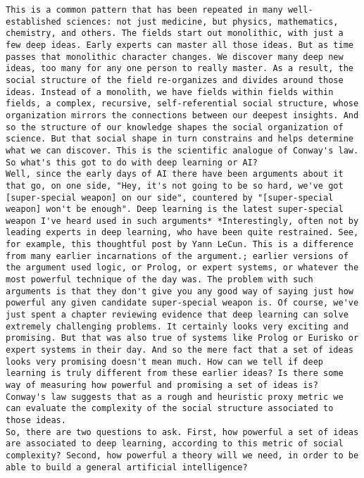\begin{lstlisting}
This is a common pattern that has been repeated in many well-established sciences: not just medicine, but physics, mathematics, chemistry, and others. The fields start out monolithic, with just a few deep ideas. Early experts can master all those ideas. But as time passes that monolithic character changes. We discover many deep new ideas, too many for any one person to really master. As a result, the social structure of the field re-organizes and divides around those ideas. Instead of a monolith, we have fields within fields within fields, a complex, recursive, self-referential social structure, whose organization mirrors the connections between our deepest insights. And so the structure of our knowledge shapes the social organization of science. But that social shape in turn constrains and helps determine what we can discover. This is the scientific analogue of Conway's law. 
So what's this got to do with deep learning or AI?
Well, since the early days of AI there have been arguments about it that go, on one side, "Hey, it's not going to be so hard, we've got [super-special weapon] on our side", countered by "[super-special weapon] won't be enough". Deep learning is the latest super-special weapon I've heard used in such arguments* *Interestingly, often not by leading experts in deep learning, who have been quite restrained. See, for example, this thoughtful post by Yann LeCun. This is a difference from many earlier incarnations of the argument.; earlier versions of the argument used logic, or Prolog, or expert systems, or whatever the most powerful technique of the day was. The problem with such arguments is that they don't give you any good way of saying just how powerful any given candidate super-special weapon is. Of course, we've just spent a chapter reviewing evidence that deep learning can solve extremely challenging problems. It certainly looks very exciting and promising. But that was also true of systems like Prolog or Eurisko or expert systems in their day. And so the mere fact that a set of ideas looks very promising doesn't mean much. How can we tell if deep learning is truly different from these earlier ideas? Is there some way of measuring how powerful and promising a set of ideas is? Conway's law suggests that as a rough and heuristic proxy metric we can evaluate the complexity of the social structure associated to those ideas.
So, there are two questions to ask. First, how powerful a set of ideas are associated to deep learning, according to this metric of social complexity? Second, how powerful a theory will we need, in order to be able to build a general artificial intelligence?

\end{lstlisting}
